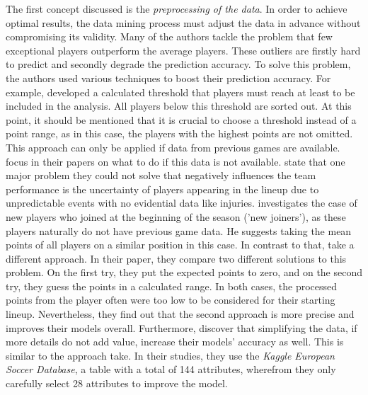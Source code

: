 \indent The first concept discussed is the \emph{preprocessing of the data}. In order to achieve optimal results, the data mining process must adjust the data in advance without compromising its validity. Many of the authors tackle the problem that few exceptional players outperform the average players. These outliers are firstly hard to predict and secondly degrade the prediction accuracy. To solve this problem, the authors used various techniques to boost their prediction accuracy. For example, \citet{landers_machine_2017} developed a calculated threshold that players must reach at least to be included in the analysis. All players below this threshold are sorted out. At this point, it should be mentioned that it is crucial to choose a threshold instead of a point range, as in this case, the players with the highest points are not omitted. This approach can only be applied if data from previous games are available. \citet{lutz_fantasy_2015,egidi_bayesian_2018,yurko_nflwar_2019} focus in their papers on what to do if this data is not available. \citet{yurko_nflwar_2019} state that one major problem they could not solve that negatively influences the team performance is the uncertainty of players appearing in the lineup due to unpredictable events with no evidential data like injuries. \citet{lutz_fantasy_2015} investigates the case of new players who joined at the beginning of the season ('new joiners'), as these players naturally do not have previous game data. He suggests taking the mean points of all players on a similar position in this case. \parencite[cf.][, p. 3]{lutz_fantasy_2015} In contrast to that, \citet{egidi_bayesian_2018} take a different approach. In their paper, they compare two different solutions to this problem. On the first try, they put the expected points to zero, and on the second try, they guess the points in a calculated range. In both cases, the processed points from the player often were too low to be considered for their starting lineup. Nevertheless, they find out that the second approach is more precise and improves their models overall. Furthermore, \citet{egidi_bayesian_2018} discover that simplifying the data, if more details do not add value, increase their models' accuracy as well. This is similar to the approach \citet{deng_analysis_2020} take. In their studies, they use the \emph{Kaggle European Soccer Database}, a table with a total of 144 attributes, wherefrom they only carefully select 28 attributes to improve the model. \\
